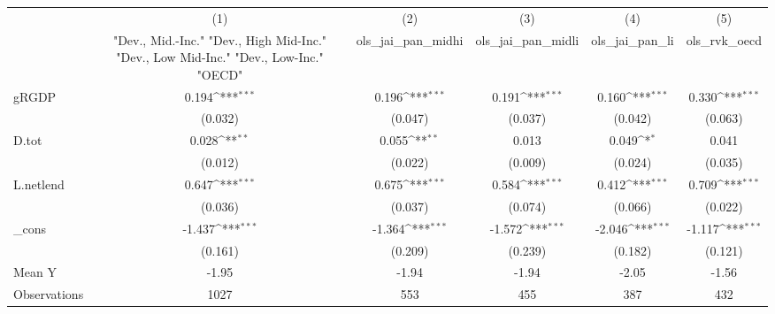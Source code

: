 {
\def\sym#1{\ifmmode^{#1}\else\(^{#1}\)\fi}
\begin{tabular}{l*{5}{c}}
\toprule
            &\multicolumn{1}{c}{(1)}&\multicolumn{1}{c}{(2)}&\multicolumn{1}{c}{(3)}&\multicolumn{1}{c}{(4)}&\multicolumn{1}{c}{(5)}\\
            &\multicolumn{1}{c}{ "Dev., Mid.-Inc." "Dev., High Mid-Inc." "Dev., Low Mid-Inc." "Dev., Low-Inc." "OECD" }&\multicolumn{1}{c}{ols\_jai\_pan\_midhi}&\multicolumn{1}{c}{ols\_jai\_pan\_midli}&\multicolumn{1}{c}{ols\_jai\_pan\_li}&\multicolumn{1}{c}{ols\_rvk\_oecd}\\
\midrule
gRGDP       &       0.194\sym{***}&       0.196\sym{***}&       0.191\sym{***}&       0.160\sym{***}&       0.330\sym{***}\\
            &     (0.032)         &     (0.047)         &     (0.037)         &     (0.042)         &     (0.063)         \\
\addlinespace
D.tot       &       0.028\sym{**} &       0.055\sym{**} &       0.013         &       0.049\sym{*}  &       0.041         \\
            &     (0.012)         &     (0.022)         &     (0.009)         &     (0.024)         &     (0.035)         \\
\addlinespace
L.netlend   &       0.647\sym{***}&       0.675\sym{***}&       0.584\sym{***}&       0.412\sym{***}&       0.709\sym{***}\\
            &     (0.036)         &     (0.037)         &     (0.074)         &     (0.066)         &     (0.022)         \\
\addlinespace
\_cons      &      -1.437\sym{***}&      -1.364\sym{***}&      -1.572\sym{***}&      -2.046\sym{***}&      -1.117\sym{***}\\
            &     (0.161)         &     (0.209)         &     (0.239)         &     (0.182)         &     (0.121)         \\
\midrule
Mean Y      &       -1.95         &       -1.94         &       -1.94         &       -2.05         &       -1.56         \\
Observations&        1027         &         553         &         455         &         387         &         432         \\
\bottomrule
\end{tabular}
}

